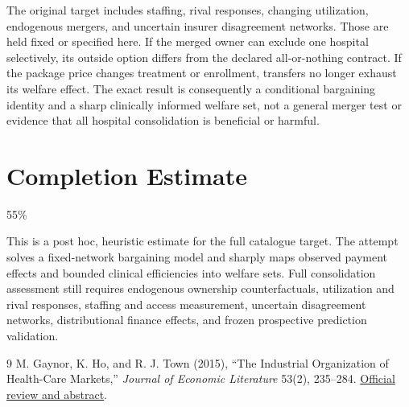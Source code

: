 \documentclass[11pt]{article}
\theoremstyle{definition}
\begin{document}
The original target includes staffing, rival responses, changing utilization, endogenous mergers, and uncertain insurer disagreement networks. Those are held fixed or specified here. If the merged owner can exclude one hospital selectively, its outside option differs from the declared all-or-nothing contract. If the package price changes treatment or enrollment, transfers no longer exhaust its welfare effect. The exact result is consequently a conditional bargaining identity and a sharp clinically informed welfare set, not a general merger test or evidence that all hospital consolidation is beneficial or harmful.

\section{Completion Estimate}
55\%

This is a post hoc, heuristic estimate for the full catalogue target.
The attempt solves a fixed-network bargaining model and sharply maps observed payment effects and bounded clinical efficiencies into welfare sets. Full consolidation assessment still requires endogenous ownership counterfactuals, utilization and rival responses, staffing and access measurement, uncertain disagreement networks, distributional finance effects, and frozen prospective prediction validation.

\begin{thebibliography}{9}
 M. Gaynor, K. Ho, and R. J. Town (2015), ``The Industrial Organization of Health-Care Markets,'' \emph{Journal of Economic Literature} 53(2), 235--284. \href{https://www.aeaweb.org/articles?id=10.1257/jel.53.2.235}{Official review and abstract}.
\end{thebibliography}
\end{document}
